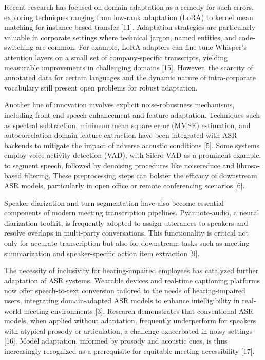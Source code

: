 \documentclass[12pt,a4paper]{article}
\begin{document}
Recent research has focused on domain adaptation as a remedy for such errors, exploring techniques ranging from low-rank adaptation (LoRA) to kernel mean matching for instance-based transfer [11]. Adaptation strategies are particularly valuable in corporate settings where technical jargon, named entities, and code-switching are common. For example, LoRA adapters can fine-tune Whisper’s attention layers on a small set of company-specific transcripts, yielding measurable improvements in challenging domains [15]. However, the scarcity of annotated data for certain languages and the dynamic nature of intra-corporate vocabulary still present open problems for robust adaptation.


Another line of innovation involves explicit noise-robustness mechanisms, including front-end speech enhancement and feature adaptation. Techniques such as spectral subtraction, minimum mean square error (MMSE) estimation, and autocorrelation domain feature extraction have been integrated with ASR backends to mitigate the impact of adverse acoustic conditions [5]. Some systems employ voice activity detection (VAD), with Silero VAD as a prominent example, to segment speech, followed by denoising procedures like noisereduce and librosa-based filtering. These preprocessing steps can bolster the efficacy of downstream ASR models, particularly in open office or remote conferencing scenarios [6].


Speaker diarization and turn segmentation have also become essential components of modern meeting transcription pipelines. Pyannote-audio, a neural diarization toolkit, is frequently adopted to assign utterances to speakers and resolve overlaps in multi-party conversations. This functionality is critical not only for accurate transcription but also for downstream tasks such as meeting summarization and speaker-specific action item extraction [9].


The necessity of inclusivity for hearing-impaired employees has catalyzed further adaptation of ASR systems. Wearable devices and real-time captioning platforms now offer speech-to-text conversion tailored to the needs of hearing-impaired users, integrating domain-adapted ASR models to enhance intelligibility in real-world meeting environments [3]. Research demonstrates that conventional ASR models, when applied without adaptation, frequently underperform for speakers with atypical prosody or articulation, a challenge exacerbated in noisy settings [16]. Model adaptation, informed by prosody and acoustic cues, is thus increasingly recognized as a prerequisite for equitable meeting accessibility [17].
\end{document}
